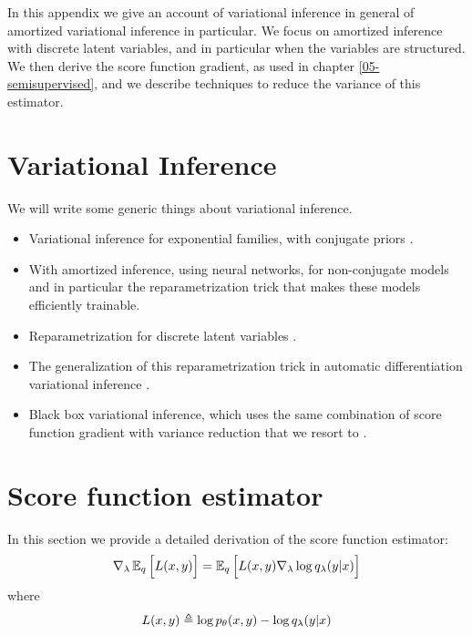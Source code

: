 % 

In this appendix we give an account of variational inference in general of amortized variational inference in particular. We focus on amortized inference with discrete latent variables, and in particular when the variables are structured. We then derive the score function gradient, as used in chapter \ref{05-semisupervised}, and we describe techniques to reduce the variance of this estimator.


\section{Variational Inference}
We will write some generic things about variational inference.
\begin{itemize}
  \item Variational inference for exponential families, with conjugate priors \citep{Jordan+1999:VI,Jordan+2008:GM,Blei+2016:VI}.
  \item With amortized inference, using neural networks, for non-conjugate models \citep{Kingma+2014:VAE,Rezende+14:DGM} and in particular the reparametrization trick that makes these models efficiently trainable.
  \item Reparametrization for discrete latent variables \citep{maddison2017concrete,jang2017gumbel}.
  \item The generalization of this reparametrization trick in automatic differentiation variational inference \citep{kucukelbir2017automatic}.
  \item Black box variational inference, which uses the same combination of score function gradient with variance reduction that we resort to \citep{Ranganath+2014:BBVI}.
\end{itemize}


\section{Score function estimator}
In this section we provide a detailed derivation of the score function estimator:
\begin{align}
  \label{eq:score-function-estimator}
  \nabla_{\lambda} \operatorname{\mathbb{E}}_{q} \Big[ L(x, y) \Big] = \operatorname{\mathbb{E}}_{q} \Big[ L(x, y) \nabla_{\lambda} \log q_{\lambda}(y | x) \Big]
\end{align}
where
\begin{equation*}
  L(x, y) \triangleq \log p_{\theta}(x, y) - \log q_{\lambda}(y | x)
\end{equation*}

